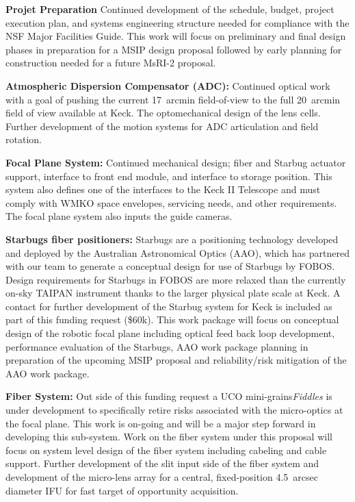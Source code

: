 \noindent \textbf{Projet Preparation} Continued development of the
schedule, budget, project execution plan, and systems engineering
structure needed for compliance with the NSF Major Facilities Guide.
This work will focus on preliminary and final design phases in
preparation for a MSIP design proposal followed by early planning for
construction needed for a future MsRI-2 proposal. 

\noindent \textbf{Atmospheric Dispersion Compensator (ADC):} Continued
optical work with a goal of pushing the current 17~arcmin field-of-view
to the full 20~arcmin field of view available at Keck.  The
optomechanical design of the lens cells.  Further development of the
motion systems for ADC articulation and field rotation.

\noindent \textbf{Focal Plane System:} Continued mechanical design;
fiber and Starbug actuator support, interface to front end module, and
interface to storage position. This system also defines one of the
interfaces to the Keck II Telescope and must comply with WMKO space
envelopes, servicing needs, and other requirements. The focal plane
system also inputs the guide cameras. 

\noindent \textbf{Starbugs fiber positioners:} Starbugs are a
positioning technology developed and deployed by the Australian
Astronomical Optics (AAO), which has partnered with our team to
generate a conceptual design for use of Starbugs by FOBOS.  Design
requirements for Starbugs in FOBOS are more relaxed than the currently
on-sky TAIPAN instrument thanks to the larger physical plate scale at
Keck. A contact for further development of the Starbug system for Keck
is included as part of this funding request (\$60k).  This work package
will focus on conceptual design of the robotic focal plane including
optical feed back loop development, performance evaluation of the
Starbugs, AAO work package planning in preparation of the upcoming MSIP
proposal and reliability/risk mitigation of the AAO work package.

\noindent \textbf{Fiber System:} Out side of this funding request a UCO
mini-grains{\it Fiddles} is under development to specifically retire
risks associated with the micro-optics at the focal plane.  This work is
on-going and will be a major step forward in developing this sub-system.
Work on the fiber system under this proposal will focus on system level
design of the fiber system including cabeling and cable support. Further
development of the slit input side of the fiber system and development
of the micro-lens array for a central, fixed-position 4.5~arcsec
diameter IFU for fast target of opportunity acquisition.

